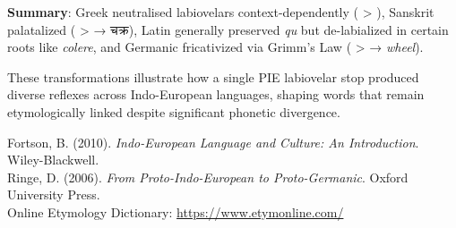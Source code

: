 \begin{technical}
\textbf{Summary}: Greek neutralised labiovelars context-dependently ( > ), Sanskrit palatalized ( >  → \textsanskrit{चक्र}), Latin generally preserved \emph{qu} but de-labialized in certain roots like \emph{colere}, and Germanic fricativized via Grimm's Law ( >  → \emph{wheel}).

\noindent
These transformations illustrate how a single PIE labiovelar stop produced diverse reflexes across Indo-European languages, shaping words that remain etymologically linked despite significant phonetic divergence.

\techref
{\footnotesize
Fortson, B. (2010). \textit{Indo-European Language and Culture: An Introduction}. Wiley-Blackwell.\\
Ringe, D. (2006). \textit{From Proto-Indo-European to Proto-Germanic}. Oxford University Press.\\
Online Etymology Dictionary: \textcolor{black}{\url{https://www.etymonline.com/}}\\
}
\end{technical}
